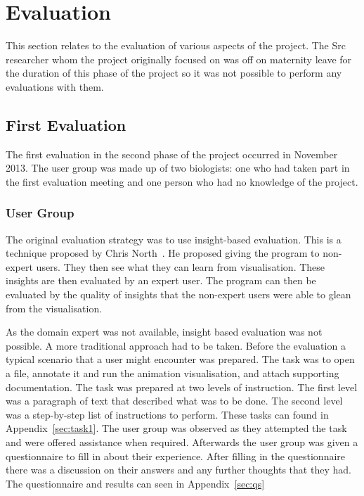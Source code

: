 \chapter{Evaluation}
\label{chap:eval}

This section relates to the evaluation of various aspects of the project.  The Src researcher whom the project originally focused on was off on maternity leave for the duration of this phase of the project so it was not possible to perform any evaluations with them.

\section{First Evaluation}
\label{sec:eval1}

The first evaluation in the second phase of the project occurred in November 2013.  The user group was made up of two biologists:  one who had taken part in the first evaluation meeting and one person who had no knowledge of the project.

\subsection{User Group}

The original evaluation strategy was to use insight-based evaluation.  This is a technique proposed by Chris North~\cite{cn_vizbi}.  He proposed giving the program to non-expert users.  They then see what they can learn from visualisation.  These insights are then evaluated by an expert user.  The program can then be evaluated by the quality of insights that the non-expert users were able to glean from the visualisation.

As the domain expert was not available, insight based evaluation was not possible.  A more traditional approach had to be taken.  Before the evaluation  a typical scenario that a user might encounter was prepared.  The task was to open a file, annotate it and run the animation visualisation, and attach supporting documentation.  The task was prepared at two levels of instruction.  The first level was a paragraph of text that described what was to be done.  The second level was a step-by-step list of instructions to perform.  These tasks can found in Appendix~\ref{sec:task1}.  The user group was observed as they attempted the task and were offered assistance when required.  Afterwards the user group was given a questionnaire to fill in about their experience. After filling in the questionnaire there was a discussion on their answers and any further thoughts that they had.  The questionnaire and results can seen in Appendix~\ref{sec:qs}

